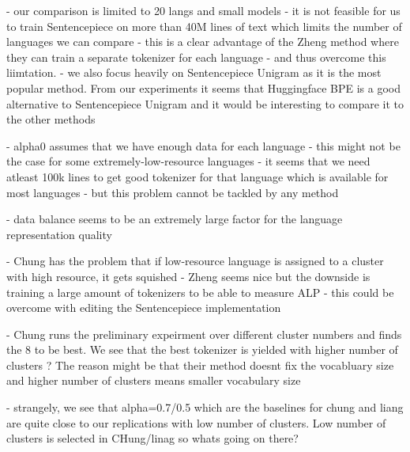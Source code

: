 - our comparison is limited to 20 langs and small models
    - it is not feasible for us to train Sentencepiece on more than 40M lines of text which limits the number of languages we can compare
    - this is a clear advantage of the Zheng method where they can train a separate tokenizer for each language - and thus overcome this liimtation.
- we also focus heavily on Sentencepiece Unigram as it is the most popular method. From our experiments it seems that Huggingface BPE is a good alternative to Sentencepiece Unigram and it would be interesting to compare it to the other methods

- alpha0 assumes that we have enough data for each language
    - this might not be the case for some extremely-low-resource languages
    - it seems that we need atleast 100k lines to get good tokenizer for that language which is available for most languages
    - but this problem cannot be tackled by any method

- data balance seems to be an extremely large factor for the language representation quality

- Chung has the problem that if low-resource language is assigned to a cluster with high resource, it gets squished
- Zheng seems nice but the downside is training a large amount of tokenizers to be able to measure ALP - this could be overcome with editing the Sentencepiece implementation

- Chung runs the preliminary expeirment over different cluster numbers and finds the 8 to be best. We see that the best tokenizer is yielded with higher number of clusters ? The reason might be that their method doesnt fix the vocabluary size and higher number of clusters means smaller vocabulary size

- strangely, we see that alpha=0.7/0.5 which are the baselines for chung and liang are quite close to our replications with low number of clusters. Low number of clusters is selected in CHung/linag so whats going on there?